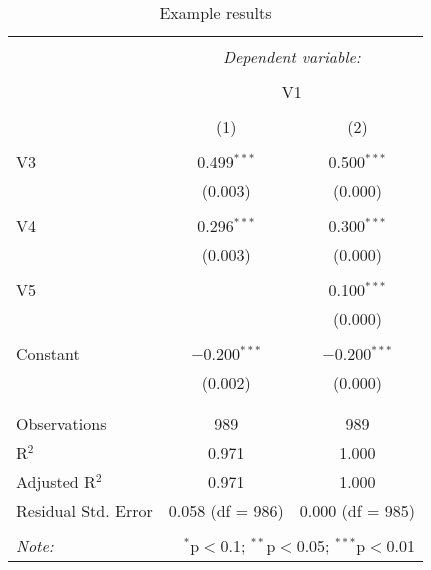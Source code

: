 
\begin{table}[!htbp] \centering 
  \caption{Example results} 
  \label{tab:example} 
\begin{tabular}{@{\extracolsep{5pt}}lcc} 
\\[-1.8ex]\hline 
\hline \\[-1.8ex] 
 & \multicolumn{2}{c}{\textit{Dependent variable:}} \\ 
\cline{2-3} 
\\[-1.8ex] & \multicolumn{2}{c}{V1} \\ 
\\[-1.8ex] & (1) & (2)\\ 
\hline \\[-1.8ex] 
 V3 & 0.499$^{***}$ & 0.500$^{***}$ \\ 
  & (0.003) & (0.000) \\ 
  & & \\ 
 V4 & 0.296$^{***}$ & 0.300$^{***}$ \\ 
  & (0.003) & (0.000) \\ 
  & & \\ 
 V5 &  & 0.100$^{***}$ \\ 
  &  & (0.000) \\ 
  & & \\ 
 Constant & $-$0.200$^{***}$ & $-$0.200$^{***}$ \\ 
  & (0.002) & (0.000) \\ 
  & & \\ 
\hline \\[-1.8ex] 
Observations & 989 & 989 \\ 
R$^{2}$ & 0.971 & 1.000 \\ 
Adjusted R$^{2}$ & 0.971 & 1.000 \\ 
Residual Std. Error & 0.058 (df = 986) & 0.000 (df = 985) \\ 
\hline 
\hline \\[-1.8ex] 
\textit{Note:}  & \multicolumn{2}{r}{$^{*}$p$<$0.1; $^{**}$p$<$0.05; $^{***}$p$<$0.01} \\ 
\end{tabular} 
\end{table} 
